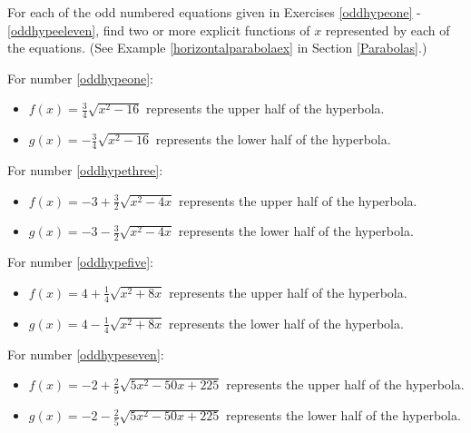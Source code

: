 \documentclass{ximera}
\begin{document}
\begin{problem}
    For each of the odd numbered equations given in Exercises \ref{oddhypeone} - \ref{oddhypeeleven}, find two or more explicit functions of $x$ represented by each of the equations.  (See Example \ref{horizontalparabolaex} in Section \ref{Parabolas}.)

\begin{solution}
For number \ref{oddhypeone}:

\begin{itemize}

\item  $f(x) = \frac{3}{4} \sqrt{x^2-16}$ represents the upper half of the hyperbola.

\item  $g(x) =  -\frac{3}{4} \sqrt{x^2-16}$ represents the lower half of the hyperbola.

\end{itemize}

For number \ref{oddhypethree}:

\begin{itemize}

\item  $f(x) = -3 + \frac{3}{2} \sqrt{x^2-4x} $ represents the upper half of the hyperbola.

\item  $g(x) = -3 -  \frac{3}{2} \sqrt{x^2-4x} $ represents the lower half of the hyperbola.

\end{itemize}
For number \ref{oddhypefive}:

\begin{itemize}

\item  $f(x) = 4 + \frac{1}{4} \sqrt{x^2+8x} $ represents the upper half of the hyperbola.

\item  $g(x) = 4 - \frac{1}{4} \sqrt{x^2+8x}  $ represents the lower half of the hyperbola.

\end{itemize}


For number \ref{oddhypeseven}:

\begin{itemize}

\item  $f(x) = -2 + \frac{2}{5} \sqrt{5x^2-50x+225}$ represents the upper half of the hyperbola.

\item  $g(x) =-2 - \frac{2}{5} \sqrt{5x^2-50x+225}$ represents the lower half of the hyperbola.


\end{itemize}
\end{solution}
\end{problem}
\end{document}
